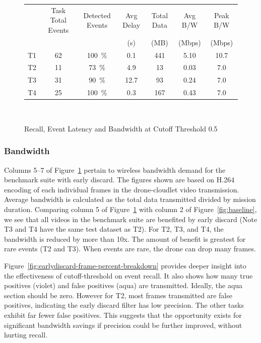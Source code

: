 \begin{figure}
\centering
\begin{tabular}{|c|c|c|c|c|c|c|}
\hline
   &Task Total Events   &Detected Events       &Avg Delay & Total Data &Avg B/W &Peak B/W\\
   & & &(s)&(MB)&(Mbps)&(Mbps)\\ 

\hline
T1 & \phantom{0}62  & 100~\%       &  \phantom{0}0.1&\phantom{0}441  &  5.10     &   10.7  \\
\hline
T2 & \phantom{0}11  & \phantom{0}73~\%      & \phantom{0}4.9 & \phantom{00}13            &  0.03 & \phantom{0}7.0 \\ %
\hline
T3 & \phantom{0}31  & \phantom{0}90~\%  & 12.7 & \phantom{00}93  &  0.24 &  \phantom{0}7.0 \\ %
\hline
T4 & \phantom{0}25  & 100~\%       & \phantom{0}0.3 & \phantom{0}167  &  0.43 &  \phantom{0}7.0 \\
\hline
\end{tabular}\\
\caption{Recall, Event Latency and Bandwidth at Cutoff Threshold 0.5}
\label{fig:early-discard-results}
\end{figure}


\subsubsection{Bandwidth}
Columns 5--7 of Figure~\ref{fig:early-discard-results} pertain to wireless
bandwidth demand for the benchmark suite with early discard.  The figures shown
are based on H.264 encoding of each individual frames in the drone-cloudlet
video transmission. Average bandwidth is calculated as the total data
transmitted divided by mission duration.  Comparing column 5 of
Figure~\ref{fig:early-discard-results} with column 2 of
Figure~\ref{fig:baseline}, we see that all videos in the benchmark suite are
benefited by early discard (Note T3 and T4 have the same test dataset as T2).
For T2, T3, and T4, the bandwidth is reduced by more than 10x. The amount of
benefit is greatest for rare events (T2 and T3).  When events are rare, the
drone can drop many frames.

Figure~\ref{fig:earlydiscard-frame-percent-breakdown} provides deeper insight
into the effectiveness of cutoff-threshold on event recall. It also shows how
many true positives (violet) and false positives (aqua) are
transmitted. Ideally, the aqua section should be zero.  However for T2, most
frames transmitted are false positives, indicating the early discard filter has
low precision.  The other tasks exhibit far fewer false positives.  This
suggests that the opportunity exists for significant bandwidth savings if
precision could be further improved, without hurting recall.

